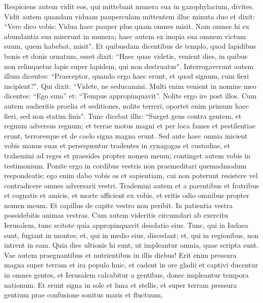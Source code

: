 \begin{biblechapter}  
\verse Respiciens autem vidit eos, qui mittebant munera sua in gazophylacium, divites. 
\verse Vidit autem quandam viduam pauperculam mittentem illuc minuta duo  
\verse et dixit: “Vere dico vobis: Vidua haec pauper plus quam omnes misit. 
\verse Nam omnes hi ex abundantia sua miserunt in munera; haec autem ex inopia sua omnem victum suum, quem habebat, misit". 
\verse Et quibusdam dicentibus de templo, quod lapidibus bonis et donis ornatum, esset dixit: 
\verse “Haec quae videtis, venient dies, in quibus non relinquetur lapis super lapidem, qui non destruatur". 
\verse Interrogaverunt autem illum dicentes: “Praeceptor, quando ergo haec erunt, et quod signum, cum fieri incipient?". 
\verse Qui dixit: “Videte, ne seducamini. Multi enim venient in nomine meo dicentes: “Ego sum” et: “Tempus appropinquavit”. Nolite ergo ire post illos. 
\verse Cum autem audieritis proelia et seditiones, nolite terreri; oportet enim primum haec fieri, sed non statim finis". 
\verse Tunc dicebat illis: “Surget gens contra gentem, et regnum adversus regnum; 
\verse et terrae motus magni et per loca fames et pestilentiae erunt, terroresque et de caelo signa magna erunt. 
\verse Sed ante haec omnia inicient vobis manus suas et persequentur tradentes in synagogas et custodias, et trahemini ad reges et praesides propter nomen meum; 
\verse continget autem vobis in testimonium. 
\verse Ponite ergo in cordibus vestris non praemeditari quemadmodum respondeatis; 
\verse ego enim dabo vobis os et sapientiam, cui non poterunt resistere vel contradicere omnes adversarii vestri. 
\verse Trademini autem et a parentibus et fratribus et cognatis et amicis, et morte afficient ex vobis, 
\verse et eritis odio omnibus propter nomen meum. 
\verse Et capillus de capite vestro non peribit. 
\verse In patientia vestra possidebitis animas vestras. 
\verse Cum autem videritis circumdari ab exercitu Ierusalem, tunc scitote quia appropinquavit desolatio eius. 
\verse Tunc, qui in Iudaea sunt, fugiant in montes; et, qui in medio eius, discedant; et, qui in regionibus, non intrent in eam. 
\verse Quia dies ultionis hi sunt, ut impleantur omnia, quae scripta sunt.  
\verse Vae autem praegnantibus et nutrientibus in illis diebus! Erit enim pressura magna super terram et ira populo huic, 
\verse et cadent in ore gladii et captivi ducentur in omnes gentes, et Ierusalem calcabitur a gentibus, donec impleantur tempora nationum. 
\verse Et erunt signa in sole et luna et stellis, et super terram pressura gentium prae confusione sonitus maris et fluctuum, 

\end{biblechapter}
